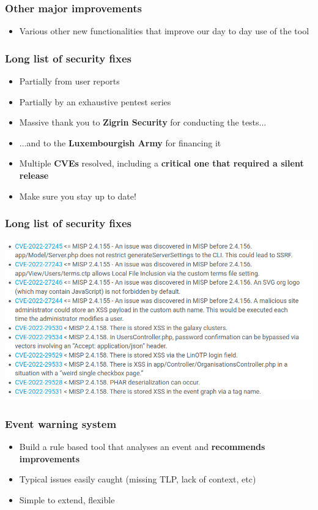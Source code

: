 \begin{frame}
  \frametitle{Other major improvements}
  \begin{itemize}
      \item Various other new functionalities that improve our day to day use of the tool
  \end{itemize}
\end{frame}

\begin{frame}
  \frametitle{Long list of security fixes}
  \begin{itemize}
      \item Partially from user reports
      \item Partially by an exhaustive pentest series
      \item Massive thank you to {\bf Zigrin Security} for conducting the tests...
      \item ...and to the {\bf Luxembourgish Army} for financing it
      \item Multiple {\bf CVEs} resolved, including a {\bf critical one that required a silent release}
      \item Make sure you stay up to date!
  \end{itemize}
\end{frame}

\begin{frame}
\frametitle{Long list of security fixes}
\includegraphics[scale=0.4]{images/security.png}
\end{frame}


\begin{frame}
  \frametitle{Event warning system}
  \begin{itemize}
     \item Build a rule based tool that analyses an event and {\bf recommends improvements}
     \item Typical issues easily caught (missing TLP, lack of context, etc)
     \item Simple to extend, flexible
  \end{itemize}
\end{frame}

